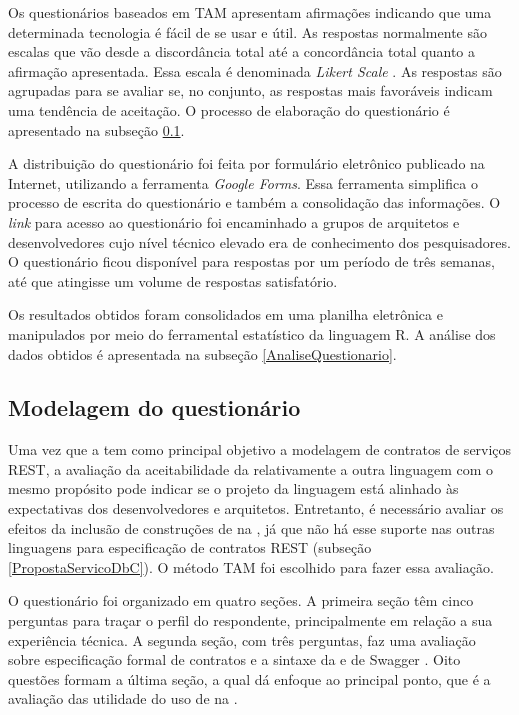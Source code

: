 Os questionários baseados em TAM apresentam afirmações indicando que uma
determinada tecnologia é fácil de se usar e útil. As respostas normalmente são
escalas que vão desde a discordância total até a concordância total quanto a
afirmação apresentada. Essa escala é denominada \textit{Likert Scale}
\cite{allen2007likert}. As respostas são agrupadas para se avaliar se, no
conjunto, as respostas mais favoráveis indicam uma tendência de aceitação. O
processo de elaboração do questionário é apresentado na subseção \ref{ModelagemQuestionario}.

A distribuição do questionário foi feita por formulário eletrônico publicado na
Internet, utilizando a ferramenta \textit{Google Forms}. Essa ferramenta
simplifica o processo de escrita do questionário e também a consolidação das
informações. O \textit{link} para acesso ao questionário foi encaminhado a
grupos de arquitetos e desenvolvedores cujo nível técnico elevado era de
conhecimento dos pesquisadores. O questionário ficou disponível para respostas
por um período de três semanas, até que atingisse um volume de respostas satisfatório.

Os resultados obtidos foram consolidados em uma planilha eletrônica e
manipulados por meio do ferramental estatístico da linguagem R. A análise dos
dados obtidos é apresentada na subseção \ref{AnaliseQuestionario}.


\subsection{Modelagem do questionário}
\label{ModelagemQuestionario}

Uma vez que a
\neoidl{} tem como principal objetivo a modelagem de contratos de serviços REST,
a avaliação da aceitabilidade da \neoidl{} relativamente a outra linguagem com o
mesmo propósito pode indicar se o projeto da linguagem está alinhado às
expectativas dos desenvolvedores e arquitetos. Entretanto, é necessário
avaliar os efeitos da inclusão de construções de \designbycontract{} na
\neoidl{}, já que não há esse suporte nas outras linguagens para especificação
de contratos REST (subseção \ref{PropostaServicoDbC}). O método TAM foi
escolhido para fazer essa avaliação.

O questionário foi organizado em quatro seções. A primeira seção têm cinco
perguntas para traçar o perfil do respondente, principalmente em relação a sua
experiência técnica. A segunda seção, com três perguntas, faz uma avaliação
sobre especificação formal de contratos e a sintaxe da
\neoidl{} e de Swagger \cite{swaggerSite}.
Oito questões formam a última seção, a qual dá enfoque ao principal ponto, que é
a avaliação das utilidade do uso de \designbycontract{} na \neoidl{}. 

